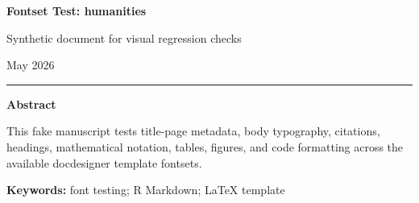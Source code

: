 \documentclass[12pt]{article}
\newif\ifdocdesigneranon
\begin{document}
\begin{titlepage}
\thispagestyle{empty}
\vspace*{0.12\textheight}
\begin{center}
\begin{singlespace}

{\LARGE\bfseries Fontset Test: humanities\par}

\vspace{0.35em}
{\large Synthetic document for visual regression checks\par}

\vspace{2.2em}

\docdesignerauthorblock

\par\vspace{1.5\baselineskip}
\docdesignerseriesblock

\ifdocdesigneranon\else
\vspace{0.35em}
{\small May 2026}\par
\fi

\vspace{2.2\baselineskip}
\noindent\rule{0.35\textwidth}{0.4pt}\par
\vspace{0.65em}
\begin{minipage}{0.78\textwidth}
\small\singlespacing
\textbf{Abstract}\par\vspace{0.3em}
This fake manuscript tests title-page metadata, body typography,
citations, headings, mathematical notation, tables, figures, and code
formatting across the available docdesigner template fontsets.
\par\vspace{0.6em}
\textbf{Keywords:} font testing; R Markdown; LaTeX template
\end{minipage}

\end{singlespace}
\end{center}
\vfill
\end{titlepage}
\else
\end{document}

